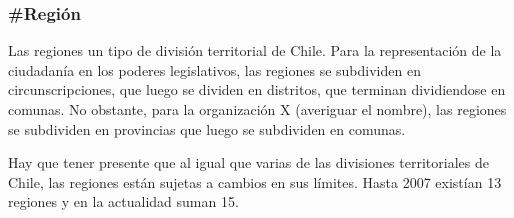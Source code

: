 \subsubsection{\#Región}

Las regiones un tipo de división territorial de Chile. Para la
representación de la ciudadanía en los poderes legislativos, las
regiones se subdividen en circunscripciones, que luego se dividen en
distritos, que terminan dividiendose en comunas. No obstante, para la
organización X (averiguar el nombre), las regiones se subdividen en
provincias que luego se subdividen en comunas.

Hay que tener presente que al igual que varias de las divisiones
territoriales de Chile, las regiones están sujetas a cambios en sus
límites. Hasta 2007 existían 13 regiones y en la actualidad suman 15.

\begin{description}
  
\end{description}
